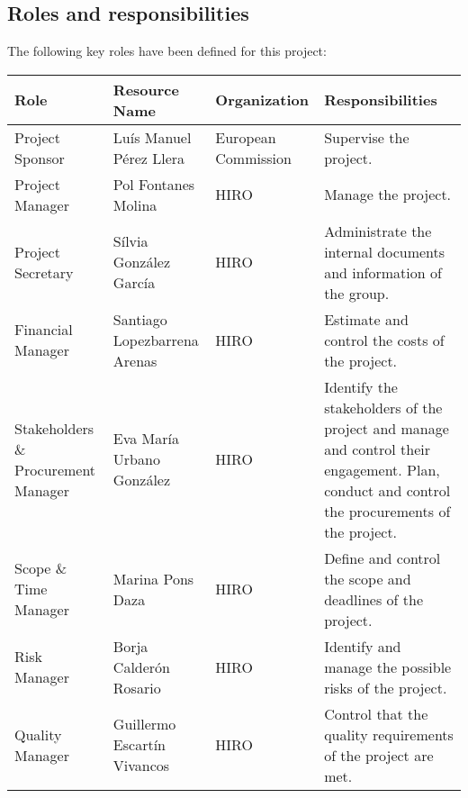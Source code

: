 \subsection{Roles and responsibilities}
The following key roles have been defined for this project:

\begin{small}	

	\begin{longtable}{>{\raggedright\arraybackslash}p{2.5cm} >{\raggedright\arraybackslash}p{2.8cm} >{\raggedright\arraybackslash}p{2.6cm}>{\raggedright\arraybackslash}p{5.2cm}}
	
		\toprule[2pt]

		\textbf{Role} & \textbf{Resource Name} & \textbf{Organization} & \textbf{Responsibilities} 
		\\ \midrule[1.5pt] 
		\endhead

		Project Sponsor & Luís Manuel Pérez Llera & European Commission & Supervise the project. \\ \midrule

		Project Manager & Pol Fontanes Molina & HIRO & Manage the project. \\ \midrule

		Project Secretary & Sílvia González García & HIRO & Administrate the internal documents and information of the group. \\ \midrule

		Financial Manager & Santiago Lopezbarrena Arenas & HIRO & Estimate and control the costs of the project. \\ \midrule

		Stakeholders \& Procurement Manager & Eva María Urbano González & HIRO & Identify the stakeholders of the project and manage and control their engagement.\newline 
		Plan, conduct and control the procurements of the project.\\ \midrule
		
		Scope \& Time Manager & Marina Pons Daza & HIRO & Define and control the scope and deadlines of the project. \\ \midrule

		Risk Manager & Borja Calderón Rosario & HIRO & Identify and manage the possible risks of the project. \\ \midrule

		Quality Manager & Guillermo Escartín Vivancos & HIRO & Control that the quality requirements of the project are met. \\ \midrule


\end{longtable}
\end{small}
